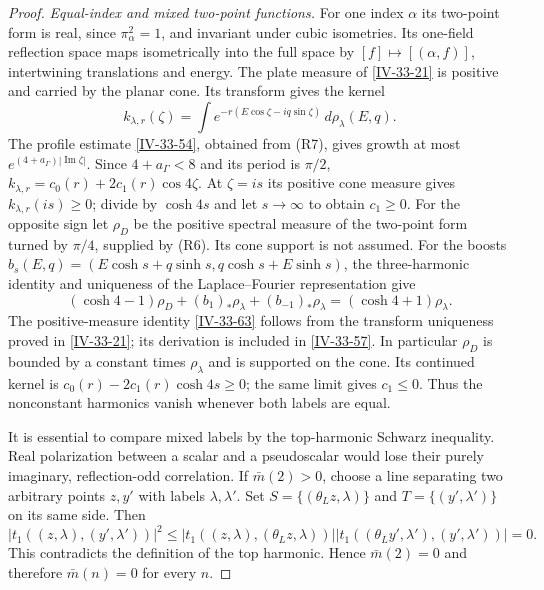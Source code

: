 \documentclass[11pt,letterpaper,reqno]{amsart}
\theoremstyle{definition}
\theoremstyle{remark}
\begin{document}
\begin{proof}
\emph{Equal-index and mixed two-point functions.}
For one index $\alpha$ its two-point form is real,
since $\pi_\alpha^2=1$, and invariant under cubic
isometries.  Its one-field reflection space maps
isometrically into the full space by
$[f]\mapsto[(\alpha,f)]$, intertwining translations
and energy.  The plate measure of \cref{IV-33-21} is positive and carried
by the planar cone. Its transform gives the kernel
\[
 k_{\lambda,r}(\zeta)=\int
 e^{-r(E\cos\zeta-iq\sin\zeta)}\,d\rho_\lambda(E,q).
\]
The profile estimate \eqref{IV-33-54}, obtained from (R7),
gives growth at most
$e^{(4+a_\Gamma)|\operatorname{Im}\zeta|}$.
Since $4+a_\Gamma<8$ and its period is $\pi/2$,
$k_{\lambda,r}=c_0(r)+2c_1(r)\cos4\zeta$.
At $\zeta=is$ its positive cone measure gives
$k_{\lambda,r}(is)\ge0$; divide by $\cosh4s$ and
let $s\to\infty$ to obtain $c_1\ge0$.
For the opposite sign let $\rho_D$ be the positive
spectral measure of the two-point form turned by
$\pi/4$, supplied by (R6).  Its cone support is
not assumed.  For the boosts
$b_s(E,q)=(E\cosh s+q\sinh s,q\cosh s+E\sinh s)$,
the three-harmonic identity and uniqueness of the
Laplace--Fourier representation give
\[
 (\cosh4-1)\rho_D+(b_1)_*\rho_\lambda+
       (b_{-1})_*\rho_\lambda
                       =(\cosh4+1)\rho_\lambda.
\]
The positive-measure identity \eqref{IV-33-63} follows from
the transform uniqueness proved in \cref{IV-33-21}; its
derivation is included in \cref{IV-33-57}.
In particular $\rho_D$ is bounded by a constant
times $\rho_\lambda$ and is supported on the cone.
Its continued kernel is
$c_0(r)-2c_1(r)\cosh4s\ge0$; the same limit gives
$c_1\le0$.  Thus the nonconstant
harmonics vanish whenever both labels are equal.

It is essential to compare mixed labels by the
top-harmonic Schwarz inequality.  Real polarization
between a scalar and a pseudoscalar would lose their
purely imaginary, reflection-odd correlation.
If $\bar m(2)>0$, choose a line separating two
arbitrary points $z,y'$ with labels $\lambda,\lambda'$.
Set $S=\{(\theta_Lz,\lambda)\}$ and
$T=\{(y',\lambda')\}$ on its same side.  Then
\[
 |t_1((z,\lambda),(y',\lambda'))|^2
 \le|t_1((z,\lambda),(\theta_Lz,\lambda))|
       |t_1((\theta_Ly',\lambda'),(y',\lambda'))|=0.
\]
This contradicts the definition of the top harmonic.
Hence $\bar m(2)=0$ and therefore $\bar m(n)=0$
for every $n$.


\end{proof}
\end{document}

